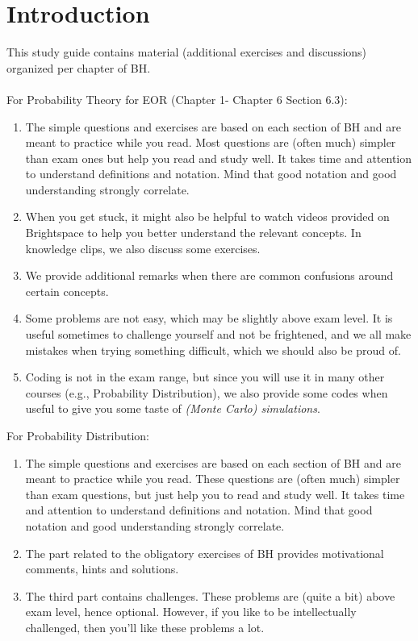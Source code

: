 \chapter{Introduction}
\label{sec:orgb865fed}

This study guide contains material (additional exercises and discussions) organized per chapter of BH. \\~\\
For Probability Theory for EOR (Chapter 1- Chapter 6 Section 6.3): 
\begin{enumerate}
	\item The simple questions and exercises are based on each section of BH and are meant to practice while you read.
	Most questions are (often much) simpler than exam ones but help you read and study well. It takes time and attention to understand definitions and notation. Mind that good notation and good understanding strongly correlate.
	\item When you get stuck, it might also be helpful to watch videos provided on Brightspace to help you better understand the relevant concepts. In knowledge clips, we also discuss some exercises. 
	\item We provide additional remarks when there are common confusions around certain concepts.
	\item Some problems are not easy, which may be slightly above exam level. It is useful sometimes to challenge yourself and not be frightened, and we all make mistakes when trying something difficult, which we should also be proud of.
	\item Coding is not in the exam range, but since you will use it in many other courses (e.g., Probability Distribution), we also provide some codes when useful to give you some taste of \textit{(Monte Carlo) simulations}.  
\end{enumerate}
For Probability Distribution: 
\begin{enumerate}
\item The simple questions and exercises are based on each section of BH and  are meant to practice while you read.
These questions are (often much) simpler than exam questions, but just help you to read and study well. It takes time and attention to understand definitions and notation. Mind that good notation and good understanding strongly correlate.
\item The part related to the obligatory exercises of BH provides motivational comments, hints and solutions.
\item The third part contains challenges.
These problems are (quite a bit) above exam level, hence optional.
However, if you like to be intellectually challenged, then you'll like these problems a lot.
\end{enumerate}


